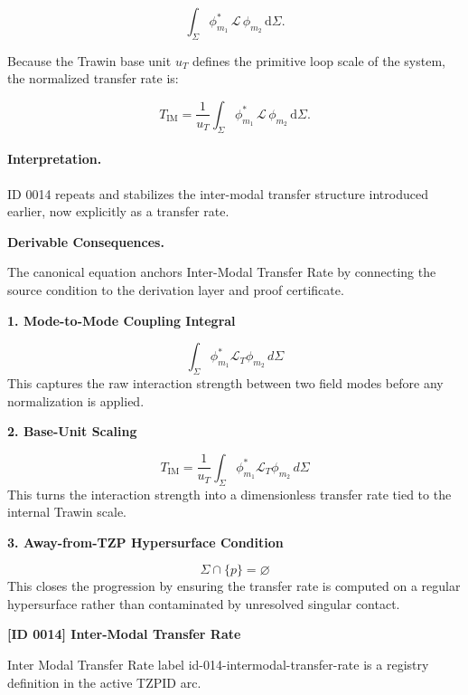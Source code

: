 \begin{equation}
\int_{\Sigma}
\phi_{m_1}^{*}
\,\mathcal{L}\,
\phi_{m_2}
\,\mathrm{d}\Sigma .
\end{equation}

Because the Trawin base unit $u_T$ defines the primitive loop scale of the system, the normalized transfer rate is:

\begin{equation}
\boxed{
T_{\mathrm{IM}}
=
\frac{1}{u_T}
\int_{\Sigma}
\phi_{m_1}^{*}
\,\mathcal{L}\,
\phi_{m_2}
\,\mathrm{d}\Sigma .
}
\end{equation}

\paragraph{Interpretation.}
ID 0014 repeats and stabilizes the inter-modal transfer structure introduced earlier, now explicitly as a transfer rate.

\par\vspace{0.35em}
\noindent\textbf{Derivable Consequences.}\quad
\begingroup
\footnotesize
\raggedright
The canonical equation anchors Inter-Modal Transfer Rate by connecting the source condition to the derivation layer and proof certificate.
\par\endgroup

\noindent\textbf{1. Mode-to-Mode Coupling Integral}\par
\[
\int_{\Sigma}
\phi_{m_{1}}^{*}\mathcal{L}_{T}\phi_{m_{2}}\, d\Sigma
\]
\noindent This captures the raw interaction strength between two field modes before any normalization is applied.\par
\noindent\textbf{2. Base-Unit Scaling}\par
\[
T_{\mathrm{IM}}
=
\frac{1}{u_{T}}
\int_{\Sigma}
\phi_{m_{1}}^{*}\mathcal{L}_{T}\phi_{m_{2}}\, d\Sigma
\]
\noindent This turns the interaction strength into a dimensionless transfer rate tied to the internal Trawin scale.\par
\noindent\textbf{3. Away-from-TZP Hypersurface Condition}\par
\[
\Sigma \cap \{p\} = \varnothing
\]
\noindent This closes the progression by ensuring the transfer rate is computed on a regular hypersurface rather than contaminated by unresolved singular contact.\par

\clearpage
\noindent\textbf{[ID 0014] Inter-Modal Transfer Rate}\par
\vspace{0.35em}
\begingroup\small
{}
Inter Modal Transfer Rate label id-014-intermodal-transfer-rate is a registry definition in the active TZPID arc.

